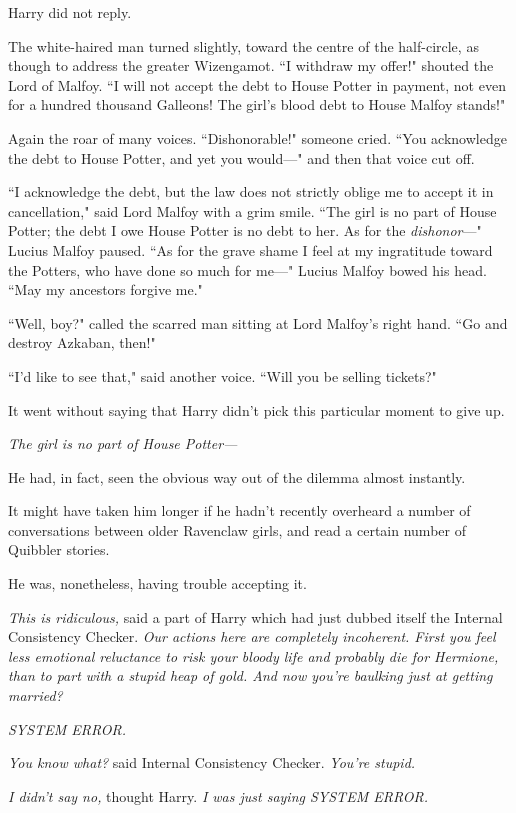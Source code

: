 Harry did not reply.

The white-haired man turned slightly, toward the centre of the half-circle, as though to address the greater Wizengamot. ``I withdraw my offer!" shouted the Lord of Malfoy. ``I will not accept the debt to House Potter in payment, not even for a hundred thousand Galleons! The girl's blood debt to House Malfoy stands!"

Again the roar of many voices. ``Dishonorable!" someone cried. ``You acknowledge the debt to House Potter, and yet you would—" and then that voice cut off.

``I acknowledge the debt, but the law does not strictly oblige me to accept it in cancellation," said Lord Malfoy with a grim smile. ``The girl is no part of House Potter; the debt I owe House Potter is no debt to her. As for the \emph{dishonor}—" Lucius Malfoy paused. ``As for the grave shame I feel at my ingratitude toward the Potters, who have done so much for me—" Lucius Malfoy bowed his head. ``May my ancestors forgive me."

``Well, boy?" called the scarred man sitting at Lord Malfoy's right hand. ``Go and destroy Azkaban, then!"

``I'd like to see that," said another voice. ``Will you be selling tickets?"

It went without saying that Harry didn't pick this particular moment to give up.

\emph{The girl is no part of House Potter—}

He had, in fact, seen the obvious way out of the dilemma almost instantly.

It might have taken him longer if he hadn't recently overheard a number of conversations between older Ravenclaw girls, and read a certain number of Quibbler stories.

He was, nonetheless, having trouble accepting it.

\emph{This is ridiculous,} said a part of Harry which had just dubbed itself the Internal Consistency Checker. \emph{Our actions here are completely incoherent. First you feel less emotional reluctance to risk your bloody \emph{life} and probably \emph{die} for Hermione, than to part with a stupid heap of gold. And now you're baulking just at getting married?}

\emph{SYSTEM ERROR.}

\emph{You know what?} said Internal Consistency Checker. \emph{You're stupid.}

\emph{I didn't say no,} thought Harry. \emph{I was just saying SYSTEM ERROR.}


